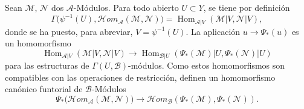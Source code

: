 \begin{env}[4.2.3]
\label{0.4.2.3-fr}
Sean $\mathcal{M}$, $\mathcal{N}$ dos $\mathcal{A}$-Módulos. Para todo
abierto $U\subset Y$, se tiene por definición
\[
  \Gamma\bigl(\psi^{-1}(U),
    \mathcal{H}\!om_{\mathcal{A}}(\mathcal{M},\mathcal{N})\bigr)
  =
  \operatorname{Hom}_{\mathcal{A}|V}
    (\mathcal{M}|V,\mathcal{N}|V),
\]
donde se ha puesto, para abreviar, $V=\psi^{-1}(U)$. La aplicación
$u\to\Psi_*(u)$ es un homomorfismo
\[
  \operatorname{Hom}_{\mathcal{A}|V}(\mathcal{M}|V,\mathcal{N}|V)
  \longrightarrow
  \operatorname{Hom}_{\mathcal{B}|U}
    (\Psi_*(\mathcal{M})|U,\Psi_*(\mathcal{N})|U)
\]
para las estructuras de $\Gamma(U,\mathcal{B})$-módulos. Como estos
homomorfismos son compatibles con las operaciones de restricción, definen
un homomorfismo canónico funtorial de $\mathcal{B}$-Módulos
\[
  \Psi_*\bigl(\mathcal{H}\!om_{\mathcal{A}}(\mathcal{M},\mathcal{N})\bigr)
  \longrightarrow
  \mathcal{H}\!om_{\mathcal{B}}
    (\Psi_*(\mathcal{M}),\Psi_*(\mathcal{N})).
  \tag{4.2.3.1}\label{0.4.2.3.1-fr}
\]
\end{env}
